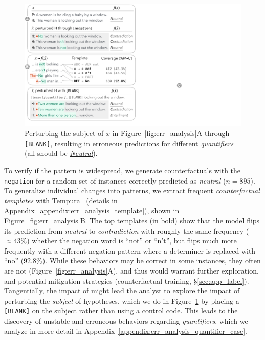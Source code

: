 \begin{figure}[t]
\centering
\includegraphics[trim={0.5cm 1.5cm 32.5cm 25.5cm}, clip,width=1\columnwidth]{figures/err_analysis.pdf}
\vspace{-5pt}
\caption{
Perturbing the subject of $x$ in Figure~\ref{fig:err_analysis}A through \texttt{[BLANK]}, resulting in erroneous predictions for different \emph{quantifiers}
(all should be \uline{\emph{Neutral}}). 
}
\vspace{-5pt}
\label{fig:err_analysis_quantifier}
\end{figure}

To verify if the pattern is widespread, we generate counterfactuals with the \texttt{negation} \tagstr for a random set of instances correctly predicted as \emph{neutral} ($n=895$). To generalize individual changes into patterns, we extract frequent \emph{counterfactual templates} with Tempura~\cite{wu2020tempura} (details in Appendix~\ref{appendix:err_analysis_template}), shown in Figure~\ref{fig:err_analysis}B.
The top templates (in bold) show that the model flips its prediction from \emph{neutral} to \emph{contradiction} with roughly the same frequency (${\approx}43\%$) whether the negation word is ``not'' or ``n't'', but flips much more frequently with a different negation pattern where a determiner is replaced with ``no'' ($92.8\%$). While these behaviors may be correct in some instances, they often are not (\eg Figure~\ref{fig:err_analysis}A), and thus would warrant further exploration, and potential mitigation strategies (\eg counterfactual training, \S\ref{sec:app_label}).
Tangentially, the impact of  might lead the analyst to explore the impact of perturbing the \emph{subject} of hypotheses, which we do in Figure~\ref{fig:err_analysis_quantifier} by placing a \texttt{[BLANK]} on the subject rather than using a control code.
This leads to the discovery of unstable and erroneous behaviors regarding \emph{quantifiers}, which we analyze in more detail in Appendix~\ref{appendix:err_analysis_quantifier_case}.




